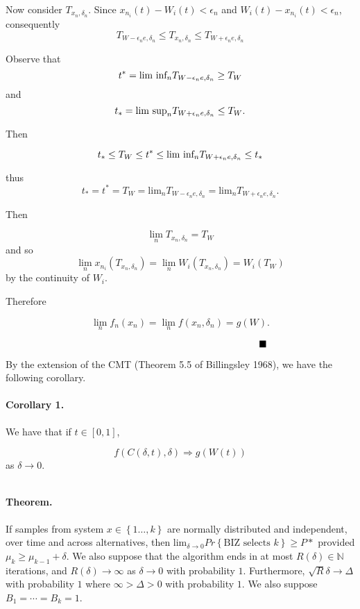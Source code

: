\documentclass[12pt,english]{article}
\begin{document}
Now consider $T_{x_{n},\delta_{n}}$. Since $x_{n_{i}}\left(t\right)-W_{i}\left(t\right)<\epsilon_{n}$
and $W_{i}\left(t\right)-x_{n_{i}}\left(t\right)<\epsilon_{n}$, consequently
\[
T_{W-\epsilon_{n}e,\delta_{n}}\leq T_{x_{n},\delta_{n}}\leq T_{W+\epsilon_{n}e,\delta_{n}}
\]


Observe that
\[
t^{*}=\text{\mbox{lim inf}}_{n}T_{W-\epsilon_{n}e,\delta_{n}}\geq T_{W}
\]
and
\[
t_{*}=\text{\mbox{lim sup}}_{n}T_{W+\epsilon_{n}e,\delta_{n}}\leq T_{W}.
\]


Then

\[
t_{*}\leq T_{W}\leq t^{*}\leq\text{\mbox{lim inf}}_{n}T_{W+\epsilon_{n}e,\delta_{n}}\leq t_{*}
\]


thus
\[
t_{*}=t^{*}=T_{W}=\mbox{lim}_{n}T_{W-\epsilon_{n}e,\delta_{n}}=\mbox{lim}_{n}T_{W+\epsilon_{n}e,\delta_{n}}.
\]


Then

\[
\lim_{n}T_{x_{n},\delta_{n}}=T_{W}
\]
and so
\[
\lim_{n}x_{n_{i}}\left(T_{x_{n},\delta_{n}}\right)=\lim_{n}W_{i}\left(T_{x_{n},\delta_{n}}\right)=W_{i}\left(T_{W}\right)
\]
by the continuity of $W_{i}$.
\[
\]


Therefore

\[
\lim_{n}f_{n}\left(x_{n}\right)=\lim_{n}f\left(x_{n},\delta_{n}\right)=g\left(W\right).
\]


$\;\;\;\;\;\;\;\;\;\;\;\;\;\;\;\;\;\;\;\;\;\;\;\;\;\;\;\;\;\;\;\;\;\;\;\;\;\;\;\;\;\;\;\;\;\;\;\;\;\;\;\;\;\;\;\;\;\;\;\;\;\;\;\;\;\;\;\;\;\;\;\;\;\;\;\;\;\;\;\;\;\;\;\;\;\;\;\;\;\;\;\;\;\;\text{\ensuremath{\blacksquare}}$

By the extension of the CMT (Theorem 5.5 of Billingsley 1968), we
have the following corollary.


\paragraph*{Corollary 1.}

We have that if $t\in\left[0,1\right]$,

\[
f\left(C\left(\delta,t\right),\delta\right)\Rightarrow g\left(W\left(t\right)\right)
\]
as $\delta\rightarrow0$.

\[
\]



\paragraph*{Theorem.}

If samples from system $x\in\left\{ 1\ldots,k\right\} $ are normally
distributed and independent, over time and across alternatives, then
$\mbox{lim}_{\delta\rightarrow0}Pr\left\{ \mbox{BIZ selects }k\right\} \geq P*$
provided $\mu_{k}\geq\mu_{k-1}+\delta$. We also suppose that the
algorithm ends in at most $R\left(\delta\right)\in\mathbb{N}$ iterations,
and $R(\delta)\rightarrow\infty$ as $\delta\rightarrow0$ with probability
$1$. Furthermore, $\sqrt{R}\delta\rightarrow\Delta$ with probability
$1$ where $\infty>\Delta>0$ with probability $1$. We also suppose
$B_{1}=\cdots=B_{k}=1$.
\end{document}

